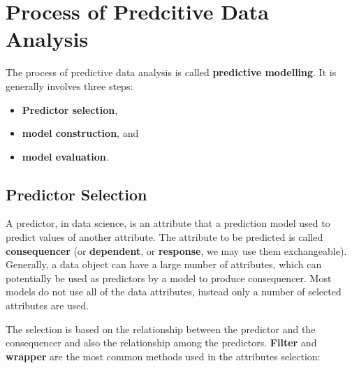 \documentclass[
]{book}
\providecommand{\tightlist}{%
  \setlength{\itemsep}{0pt}\setlength{\parskip}{0pt}}
\begin{document}
\hypertarget{process-of-predcitive-data-analysis}{%
\section{Process of Predcitive Data Analysis}\label{process-of-predcitive-data-analysis}}

The process of predictive data analysis is called \textbf{predictive modelling}. It is generally involves three steps:

\begin{itemize}
\tightlist
\item
  \textbf{Predictor selection},
\item
  \textbf{model construction}, and
\item
  \textbf{model evaluation}.
\end{itemize}

\hypertarget{predictor-selection}{%
\subsection*{Predictor Selection}\label{predictor-selection}}


A predictor, in data science, is an attribute that a prediction model used to predict values of another attribute. The attribute to be predicted is called \textbf{consequencer} (or \textbf{dependent}, or \textbf{response}, we may use them exchangeable). Generally, a data object can have a large number of attributes, which can potentially be used as predictors by a model to produce consequencer. Most models do not use all of the data attributes, instead only a number of selected attributes are used.

The selection is based on the relationship between the predictor and the consequencer and also the relationship among the predictors. \textbf{Filter} and \textbf{wrapper} are the most common methods used in the attributes selection:
\end{document}

